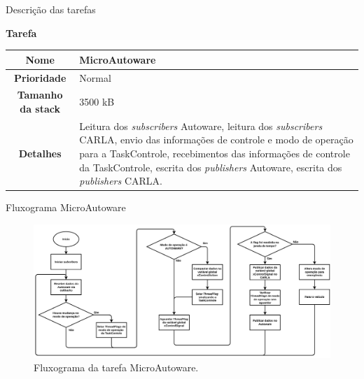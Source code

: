 \documentclass{if-beamer}
\begin{document}
\begin{frame}{Descrição das tarefas}

\begin{block}{\textbf{Tarefa}}
	
	\centering
	
	\begin{tabular}{c|p{8cm}}
		\textbf{Nome} & MicroAutoware \\
		\hline
		\textbf{Prioridade}& Normal \\
		\hline
		\textbf{Tamanho da stack} & 3500 kB \\
		\hline
		\textbf{Detalhes} & Leitura dos \textit{subscribers} Autoware, leitura dos \textit{subscribers} CARLA, envio das informações de controle e modo de operação para a TaskControle, recebimentos das informações de controle da TaskControle, escrita dos \textit{publishers} Autoware, escrita dos \textit{publishers} CARLA. \\
	\end{tabular}
	
\end{block}	

\end{frame}




\begin{frame}{Fluxograma MicroAutoware}
	
	\begin{figure}[H]
		\centering
		\includegraphics[width = \textwidth]{img/fluxograma_microautoware}
		\caption{Fluxograma da tarefa MicroAutoware.}
		\label{fig:fluxograma_microautoware}
	\end{figure}
	
\end{frame}
\end{document}
